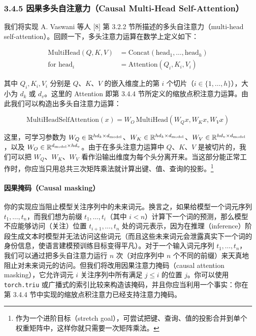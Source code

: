 \subsubsection*{3.4.5 因果多头自注意力（Causal Multi-Head Self-Attention）}

我们将实现 A. Vaswani 等人 [8] 第 3.2.2 节所描述的多头自注意力（multi-head self-attention）。回顾一下，多头注意力运算在数学上定义如下：

\begin{align*}
\mathrm{MultiHead}(Q, K, V) &= \mathrm{Concat}(\mathrm{head}_1, \dots, \mathrm{head}_h) \tag{12} \\
\text{for } \mathrm{head}_i &= \mathrm{Attention}(Q_i, K_i, V_i) \tag{13}
\end{align*}

其中 $Q_i, K_i, V_i$ 分别是 $Q$、$K$、$V$ 的嵌入维度上的第 $i$ 个切片（$i \in \{1, \dots, h\}$），大小为 $d_k$ 或 $d_v$。这里的 Attention 即第 3.4.4 节所定义的缩放点积注意力运算。由此我们可以构造出多头自注意力运算：

\begin{equation*}
\mathrm{MultiHeadSelfAttention}(x) = W_O\, \mathrm{MultiHead}(W_Q x, W_K x, W_V x)
\tag{14}
\end{equation*}

这里，可学习参数为 $W_Q \in \mathbb{R}^{h d_k \times d_{\text{model}}}$、$W_K \in \mathbb{R}^{h d_k \times d_{\text{model}}}$、$W_V \in \mathbb{R}^{h d_v \times d_{\text{model}}}$，以及 $W_O \in \mathbb{R}^{d_{\text{model}} \times h d_v}$。由于在多头注意力运算中 $Q$、$K$、$V$ 是被切片的，我们可以把 $W_Q$、$W_K$、$W_V$ 看作沿输出维度为每个头分离开来。当这部分能正常工作时，你应当只用总共三次矩阵乘法就计算出键、值、查询的投影。\footnote{作为一个进阶目标（stretch goal），可尝试把键、查询、值的投影合并到单个权重矩阵中，这样你就只需要一次矩阵乘法。}

\paragraph*{因果掩码（Causal masking）}
你的实现应当阻止模型关注序列中的未来词元。换言之，如果给模型一个词元序列 $t_1, \dots, t_n$，而我们想为前缀 $t_1, \dots, t_i$（其中 $i < n$）计算下一个词的预测，那么模型不应能够访问（关注）位置 $t_{i+1}, \dots, t_n$ 处的词元表示，因为在推理（inference）阶段生成文本时模型并无法访问这些词元（而且这些未来词元会泄露真实下一个词的身份信息，使语言建模预训练目标变得平凡）。对于一个输入词元序列 $t_1, \dots, t_n$，我们可以通过把多头自注意力运行 $n$ 次（对应序列中 $n$ 个不同的前缀）来天真地阻止对未来词元的访问。但我们将改用因果注意力掩码（causal attention masking），它允许词元 $i$ 关注序列中所有满足 $j \le i$ 的位置 $j$。你可以使用 \texttt{torch.triu} 或广播式的索引比较来构造该掩码，并且你应当利用一个事实：你在第 3.4.4 节中实现的缩放点积注意力已经支持注意力掩码。

